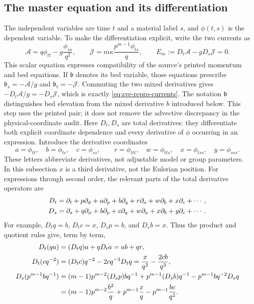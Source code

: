 \subsection{The master equation and its differentiation}
The independent variables are time $t$ and a material label $s$, and
$\phi(t,s)$ is the dependent variable. To make the differentiation explicit,
write the two currents as
\begin{equation}
 \mathcal A=q\phi_{tt}-g\frac{\phi_{ss}}{q^2},\qquad
 \mathcal J=m\kappa\frac{p^{m-1}\phi_{ts}}{q},\qquad
 E_m:=D_t\mathcal A-gD_s\mathcal J=0.
 \label{eq:sve-repro-currents}
\end{equation}
This scalar equation expresses compatibility of the source's printed
momentum and bed equations. If $\mathfrak b$ denotes its bed variable,
those equations prescribe $\mathfrak b_s=-\mathcal A/g$ and
$\mathfrak b_t=-\mathcal J$. Commuting the two mixed derivatives gives
$-D_t\mathcal A/g=-D_s\mathcal J$, which is exactly
\eqref{eq:sve-repro-currents}. The notation $\mathfrak b$ distinguishes
bed elevation from the mixed derivative $b$ introduced below. This step
uses the printed pair; it does not remove the advective discrepancy in
the physical-coordinate audit.
Here $D_t,D_s$ are total derivatives: they differentiate both explicit
coordinate dependence and every derivative of $\phi$ occurring in an
expression. Introduce the derivative coordinates
\[
 a=\phi_{tt},\quad b=\phi_{ts},\quad c=\phi_{ss},\qquad
 r=\phi_{ttt},\quad w=\phi_{tts},\quad x=\phi_{tss},\quad y=\phi_{sss}.
\]
These letters abbreviate derivatives, not adjustable model or group
parameters. In this subsection $x$ is a third derivative, not the Eulerian position.
For expressions through second order, the relevant parts of the total
derivative operators are
\begin{align}
 D_t&=\partial_t+p\partial_\phi+a\partial_p+b\partial_q
                 +r\partial_a+w\partial_b+x\partial_c+\cdots,\notag\\
 D_s&=\partial_s+q\partial_\phi+b\partial_p+c\partial_q
                 +w\partial_a+x\partial_b+y\partial_c+\cdots.
 \label{eq:sve-total-operators}
\end{align}
For example, $D_tq=b$, $D_tc=x$, $D_sp=b$, and $D_sb=x$.
Thus the product and quotient rules give, term by term,
\begin{align}
 D_t(qa)&=(D_tq)a+qD_ta=ab+qr,\notag\\
 D_t(cq^{-2})&=(D_tc)q^{-2}-2cq^{-3}D_tq
                =\frac{x}{q^2}-\frac{2cb}{q^3},\notag\\
 D_s(p^{m-1}bq^{-1})
   &=(m-1)p^{m-2}(D_sp)bq^{-1}
       +p^{m-1}(D_sb)q^{-1}-p^{m-1}bq^{-2}D_sq\notag\\
   &=(m-1)p^{m-2}\frac{b^2}{q}
       +p^{m-1}\frac{x}{q}-p^{m-1}\frac{bc}{q^2}.
 \label{eq:sve-current-differentiation}
\end{align}
